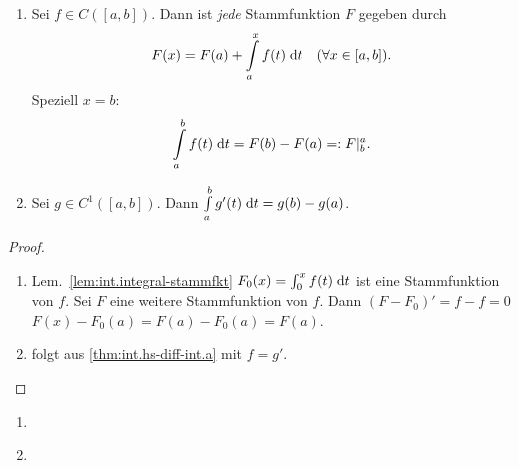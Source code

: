 \documentclass[12pt]{scrreprt}
\begin{document}
\begin{thm}
  \label{thm:int.hs-diff-int}
  \begin{enumerate}
    \item \label{thm:int.hs-diff-int.a} Sei $f\in C([a,b])$. Dann ist
      \emph{jede} Stammfunktion $F$ gegeben durch
      \[F(x)=F(a)+\int\limits_{a}^{x}{f(t)}\;\mathrm{d}t \quad (\forall
      x\in[a,b]).\]
      Speziell $x=b$: \[\int\limits_{a}^{b}{f(t)}\;\mathrm{d}t=F(b)-F(a)=:F|_b^a.\]
    \item \label{thm:int.hs-diff-int.b} Sei $g\in C^1([a,b])$. Dann $\int\limits_{a}^{b}{g'(t)}\;\mathrm{d}t=g(b)-g(a)$.
  \end{enumerate}
\end{thm}
\begin{proof}
  \begin{enumerate}
  \item Lem.~\ref{lem:int.integral-stammfkt} \folgt
    $F_0(x)=\int_{0}^{x}{f(t)}\;\mathrm{d}t$ ist eine Stammfunktion von
    $f$. Sei $F$ eine weitere Stammfunktion von $f$. Dann
    $(F-F_0)'=f-f=0$ 
    $F(x)-F_0(a)=F(a)-F_0(a)=F(a)$.
  \item folgt aus \ref{thm:int.hs-diff-int.a} mit $f=g'$.
  \end{enumerate}
\end{proof}

\begin{bsp}
  \label{bsp:int.stammfkt}

  \begin{enumerate}
    \item \label{bsp:int.stammfkt.a}
    \item \label{bsp:int.stammfkt.b}
  \end{enumerate}
\end{bsp}

\begin{satz}
  \label{satz:int.pi}

\end{satz}

\begin{bsp}
  \label{bsp:int.pi}

\end{bsp}

\begin{satz}
  \label{satz:int.subst}

\end{satz}

\begin{bsp}
  \label{bsp:int.subst}

\end{bsp}
\end{document}
